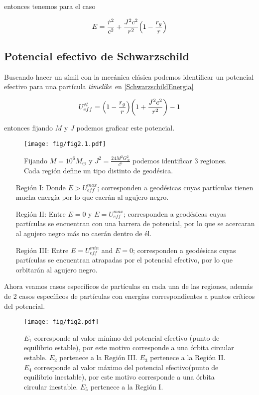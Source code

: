 \documentclass[../Main.tex]{subfiles}
\begin{document}
entonces tenemos para el caso \nl

\begin{equation}
    E = \dfrac{\dot{r}^{2}}{c^{2}} + \dfrac{J^{2}c^{2}}{r^{2}}\qty(1-\dfrac{r_{g}}{r})
    \label{NullEnergy}
\end{equation}

\subsection{Potencial efectivo de Schwarzschild}
Buscando hacer un símil con la mecánica clásica podemos identificar un potencial efectivo para una partícula $\textit{timelike}$ en \eqref{SchwarzschildEnergia}

\begin{equation}
    U_{eff}^{tl} = \qty(1-\dfrac{r_{g}}{r})\qty(1 + \dfrac{J^{2}c^{2}}{r^{2}})-1
    \label{PotencialEfectivo}
\end{equation}

entonces fijando $M$ y $J$ podemos graficar este potencial.

\begin{figure}[ht]
    \centering
    \texttt{[image: fig/fig2.1.pdf]}
    \label{potencial:regionestimelike}
    \caption{Fijando $M=10^6 M_\odot$ y $J^2=\frac{24M^2G^2_N}{c^6}$ podemos identificar 3 regiones. Cada región define un tipo distinto de geodésica.}
\end{figure}

\begin{itemize}
    \item [Región I:] Donde $E>U^{max}_{eff}$; corresponden a geodésicas cuyas partículas tienen mucha energía por lo que caerán al agujero negro.
    \item [Región II:] Entre $E=0$ y $E=U^{max}_{eff}$; corresponden a geodésicas cuyas partículas se encuentran con una barrera de potencial, por lo que se acercaran al agujero negro más no caerán dentro de él.
    \item [Región III:] Entre $E=U^{min}_{eff}$ and $E=0$; corresponden a geodésicas cuyas partículas se encuentran atrapadas por el potencial efectivo, por lo que orbitarán al agujero negro.
\end{itemize}

Ahora veamos casos específicos de partículas en cada una de las regiones, además de 2 casos específicos de partículas con energías correspondientes a puntos críticos del potencial.

\begin{figure}[ht]
    \texttt{[image: fig/fig2.pdf]}
    \label{potencial:particulas}
    \caption{$E_1$ corresponde al valor mínimo del potencial efectivo (punto de equilibrio estable), por este motivo corresponde a una órbita circular estable. $E_2$ pertenece a la Región III. $E_3$ pertenece a la Región II. $E_4$ corresponde al valor máximo del potencial efectivo(punto de equilibrio inestable), por este motivo corresponde a una órbita circular inestable. $E_5$ pertenece a la Región I.}
\end{figure}
\end{document}
